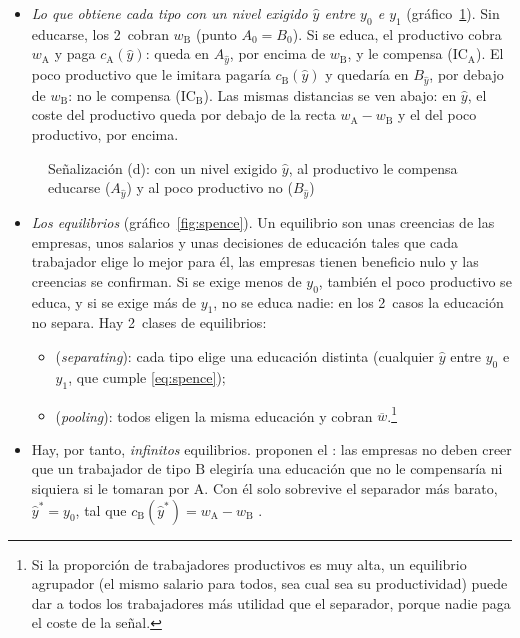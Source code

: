 \documentclass[11pt]{article}
\begin{document}
\begin{itemize}
\item \emph{Lo que obtiene cada tipo con un nivel exigido $\hat y$ entre $y_0$ e $y_1$} (gráfico~\ref{fig:spence-d}). Sin educarse, los 2~cobran $w_{\mathrm{B}}$ (punto $A_0=B_0$). Si se educa, el productivo cobra $w_{\mathrm{A}}$ y paga $c_{\mathrm{A}}(\hat y)$: queda en $A_{\hat y}$, por encima de $w_{\mathrm{B}}$, y le compensa ($\mathrm{IC}_{\mathrm{A}}$). El poco productivo que le imitara pagaría $c_{\mathrm{B}}(\hat y)$ y quedaría en $B_{\hat y}$, por debajo de $w_{\mathrm{B}}$: no le compensa ($\mathrm{IC}_{\mathrm{B}}$). Las mismas distancias se ven abajo: en $\hat y$, el coste del productivo queda por debajo de la recta $w_{\mathrm{A}}-w_{\mathrm{B}}$ y el del poco productivo, por encima.
\end{itemize}

\begin{figure}[H]
\centering
\caption{Señalización (d): con un nivel exigido $\hat y$, al productivo le compensa educarse ($A_{\hat y}$) y al poco productivo no ($B_{\hat y}$)}\label{fig:spence-d}
\end{figure}

\begin{itemize}
\item \emph{Los equilibrios} (gráfico~\ref{fig:spence}). Un equilibrio son unas creencias de las empresas, unos salarios y unas decisiones de educación tales que cada trabajador elige lo mejor para él, las empresas tienen beneficio nulo y las creencias se confirman. Si se exige menos de $y_0$, también el poco productivo se educa, y si se exige más de $y_1$, no se educa nadie: en los 2~casos la educación no separa. Hay 2~clases de equilibrios:
  \begin{itemize}
  \item {} (\emph{separating}): cada tipo elige una educación distinta (cualquier $\hat y$ entre $y_0$ e $y_1$, que cumple \eqref{eq:spence});
  \item {} (\emph{pooling}): todos eligen la misma educación y cobran $\overline{w}$.\footnote{Si la proporción de trabajadores productivos es muy alta, un equilibrio agrupador (el mismo salario para todos, sea cual sea su productividad) puede dar a todos los trabajadores más utilidad que el separador, porque nadie paga el coste de la señal.}
  \end{itemize}
\item Hay, por tanto, \emph{infinitos} equilibrios. \textcite{ChoKreps1987Signaling} proponen el : las empresas no deben creer que un trabajador de tipo $\mathrm{B}$ elegiría una educación que no le compensaría ni siquiera si le tomaran por $\mathrm{A}$. Con él solo sobrevive el separador más barato, $\hat y^*=y_0$, tal que $c_{\mathrm{B}}(\hat y^*)=w_{\mathrm{A}}-w_{\mathrm{B}}$\nocite{MasColellWhinstonGreen1995} .
\end{itemize}
\end{document}
